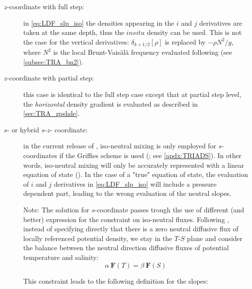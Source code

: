 \documentclass[../main/NEMO_manual]{subfiles}
\begin{document}
\begin{description}
\item [$z$-coordinate with full step:] in \autoref{eq:LDF_slp_iso} the densities appearing in the $i$ and $j$ derivatives  are taken at the same depth,
  thus the $in situ$ density can be used.
  This is not the case for the vertical derivatives: $\delta_{k+1/2}[\rho]$ is replaced by $-\rho N^2/g$,
  where $N^2$ is the local Brunt-Vais\"{a}l\"{a} frequency evaluated following \citet{mcdougall_JPO87}
  (see \autoref{subsec:TRA_bn2}).
\item [$z$-coordinate with partial step:] this case is identical to the full step case except that at partial step level,
  the \emph{horizontal} density gradient is evaluated as described in \autoref{sec:TRA_zpshde}.
\item [$s$- or hybrid $s$-$z$- coordinate:] in the current release of \NEMO, iso-neutral mixing is only employed for $s$-coordinates if
  the Griffies scheme is used (;
  see \autoref{apdx:TRIADS}).
  In other words, iso-neutral mixing will only be accurately represented with a linear equation of state
  ().
  In the case of a "true" equation of state, the evaluation of $i$ and $j$ derivatives in \autoref{eq:LDF_slp_iso}
  will include a pressure dependent part, leading to the wrong evaluation of the neutral slopes.

  Note: The solution for $s$-coordinate passes trough the use of different (and better) expression for
  the constraint on iso-neutral fluxes.
  Following \citet{griffies_bk04}, instead of specifying directly that there is a zero neutral diffusive flux of
  locally referenced potential density, we stay in the $T$-$S$ plane and consider the balance between
  the neutral direction diffusive fluxes of potential temperature and salinity:
  \[
    \alpha \ \textbf{F}(T) = \beta \ \textbf{F}(S)
  \]

This constraint leads to the following definition for the slopes:


\end{description}
\end{document}

